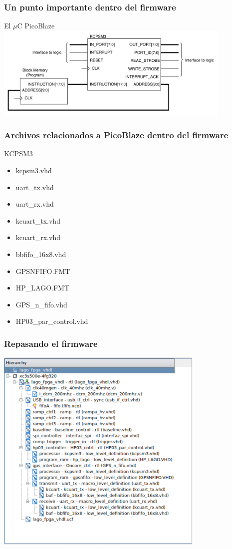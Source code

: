 \documentclass{beamer}
\begin{document}
\begin{frame}
  \frametitle{Un punto importante dentro del firmware}
  \begin{block}{El $\mu$C PicoBlaze}
    \centering
    \includegraphics[height=0.60\textheight,width=0.85\textwidth]{d5/kcpsm3}
  \end{block}
\end{frame}

\begin{frame}
  \frametitle{Archivos relacionados a PicoBlaze dentro del firmware}
  \begin{block}{KCPSM3}
    \begin{itemize}
      \item kcpsm3.vhd
      \item uart\_tx.vhd
      \item uart\_rx.vhd
      \item kcuart\_tx.vhd
      \item kcuart\_rx.vhd
      \item bbfifo\_16x8.vhd
      \item GPSNFIFO.FMT
      \item HP\_LAGO.FMT
      \item GPS\_n\_fifo.vhd
      \item HP03\_par\_control.vhd
    \end{itemize}
\end{block}
\end{frame}

\begin{frame}
  \frametitle{Repasando el firmware}
  \begin{block}{}
    \centering
    \includegraphics[height=0.75\textheight,width=0.75\textwidth]{d5/jerarquia_lago}
  \end{block}
\end{frame}
\end{document}
